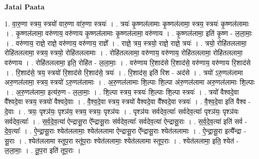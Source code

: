 \documentclass[17pt]{extarticle}
\begin{document}
\textbf{Jatai Paata} \newline

1. वा॒रु॒णा स्त्रय॒ स्त्रयो॑ वारु॒णा वा॑रु॒णा स्त्रयः॑ । . त्रयः॑ कृ॒ष्णल॑लामाः कृ॒ष्णल॑लामा॒ स्त्रय॒ स्त्रयः॑ कृ॒ष्णल॑लामाः । . कृ॒ष्णल॑लामा॒ वरु॑णाय॒ वरु॑णाय कृ॒ष्णल॑लामाः कृ॒ष्णल॑लामा॒ वरु॑णाय । . कृ॒ष्णल॑लामा॒ इति॑ कृ॒ष्ण - ल॒ला॒माः॒ । . वरु॑णाय॒ राज्ञे॒ राज्ञे॒ वरु॑णाय॒ वरु॑णाय॒ राज्ञे᳚ । . राज्ञे॒ त्रय॒ स्त्रयो॒ राज्ञे॒ राज्ञे॒ त्रयः॑ । . त्रयो॒ रोहि॑तललामा॒ रोहि॑तललामा॒ स्त्रय॒ स्त्रयो॒ रोहि॑तललामाः । . रोहि॑तललामा॒ वरु॑णाय॒ वरु॑णाय॒ रोहि॑तललामा॒ रोहि॑तललामा॒ वरु॑णाय । . रोहि॑तललामा॒ इति॒ रोहि॑त - ल॒ला॒माः॒ । . वरु॑णाय रि॒शाद॑से रि॒शाद॑से॒ वरु॑णाय॒ वरु॑णाय रि॒शाद॑से । . रि॒शाद॑से॒ त्रय॒ स्त्रयो॑ रि॒शाद॑से रि॒शाद॑से॒ त्रयः॑ । . रि॒शाद॑स॒ इति॑ रिश - अद॑से । . त्रयो॑ ऽरु॒णल॑लामा अरु॒णल॑लामा॒ स्त्रय॒ स्त्रयो॑ ऽरु॒णल॑लामाः । . अ॒रु॒णल॑लामाः शि॒ल्पाः शि॒ल्पा अ॑रु॒णल॑लामा अरु॒णल॑लामाः शि॒ल्पाः । . अ॒रु॒णल॑लामा॒ इत्य॑रु॒ण - ल॒ला॒माः॒ । . शि॒ल्पा स्त्रय॒ स्त्रयः॑ शि॒ल्पाः शि॒ल्पा स्त्रयः॑ । . त्रयो॑ वैश्वदे॒वा वै᳚श्वदे॒वा स्त्रय॒ स्त्रयो॑ वैश्वदे॒वाः । . वै॒श्व॒दे॒वा स्त्रय॒ स्त्रयो॑ वैश्वदे॒वा वै᳚श्वदे॒वा स्त्रयः॑ । . वै॒श्व॒दे॒वा इति॑ वैश्व - दे॒वाः । . त्रयः॒ पृश्ञ॑यः॒ पृश्ञ॑य॒ स्त्रय॒ स्त्रयः॒ पृश्ञ॑यः । . पृश्ञ॑यः सर्वदेव॒त्याः᳚ सर्वदेव॒त्याः᳚ पृश्ञ॑यः॒ पृश्ञ॑यः सर्वदेव॒त्याः᳚ । . स॒र्व॒दे॒व॒त्या॑ ऐन्द्रासू॒रा ऐ᳚न्द्रासू॒राः स॑र्वदेव॒त्याः᳚ सर्वदेव॒त्या॑ ऐन्द्रासू॒राः । . स॒र्व॒दे॒व॒त्या॑ इति॑ सर्व - दे॒व॒त्याः᳚ । . ऐ॒न्द्रा॒सू॒राः श्येत॑ललामाः॒ श्येत॑ललामा ऐन्द्रासू॒रा ऐ᳚न्द्रासू॒राः श्येत॑ललामाः । . ऐ॒न्द्रा॒सू॒रा इत्यै᳚न्द्रा - सू॒राः । . श्येत॑ललामा स्तूप॒रा स्तू॑प॒राः श्येत॑ललामाः॒ श्येत॑ललामा स्तूप॒राः । . श्येत॑ललामा॒ इति॒ श्येत॑ - ल॒ला॒माः॒ । . तू॒प॒रा इति॑ तूप॒राः । \newline
\end{document}
